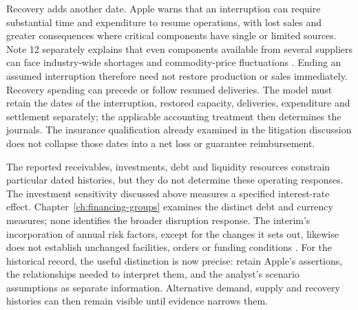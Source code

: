 Recovery adds another date. Apple warns that an interruption can require
substantial time and expenditure to resume operations, with lost sales and
greater consequences where critical components have single or limited sources.
Note 12 separately explains that even components available from several
suppliers can face industry-wide shortages and commodity-price fluctuations
\citep[Note 12, printed p.~46]{apple2024}. Ending an assumed interruption
therefore need not restore production or sales immediately. Recovery spending
can precede or follow resumed deliveries. The model must retain the dates of
the interruption, restored capacity, deliveries, expenditure and settlement
separately; the applicable accounting treatment then determines the journals.
The insurance qualification already examined in the litigation discussion
does not collapse those dates into a net loss or guarantee reimbursement.

The reported receivables, investments, debt and liquidity resources constrain
particular dated histories, but they do not determine these operating
responses. The investment sensitivity discussed above measures a specified
interest-rate effect. Chapter~\ref{ch:financing-groups} examines the distinct
debt and currency measures; none identifies the broader disruption response.
The interim's incorporation of annual risk factors, except for the changes it
sets out, likewise does not establish unchanged facilities, orders or funding
conditions \citep[Part II, Item 1A, printed p.~19]{apple2025q1}.
For the historical record, the useful distinction is now precise: retain
Apple's assertions, the relationships needed to interpret them, and the
analyst's scenario assumptions as separate information. Alternative demand,
supply and recovery histories can then remain visible until evidence narrows
them.
